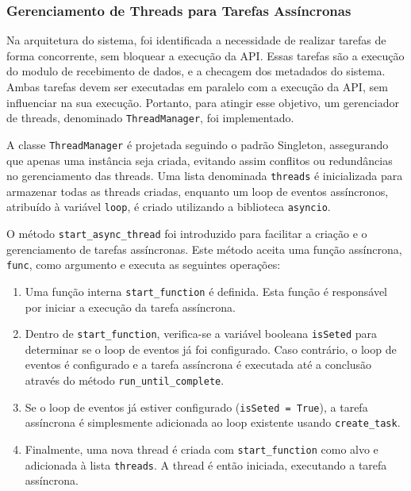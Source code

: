 \subsubsection{Gerenciamento de Threads para Tarefas Assíncronas}\label{subsubsec:ThreadManager}

Na arquitetura do sistema, foi identificada a necessidade de realizar tarefas de forma concorrente, sem bloquear a execução da API. Essas tarefas são a execução do modulo de recebimento de dados, e a checagem dos metadados do sistema. Ambas tarefas devem ser executadas em paralelo com a execução da API, sem influenciar na sua execução. Portanto, para atingir esse objetivo, um gerenciador de threads, denominado \texttt{ThreadManager}, foi implementado.

A classe \texttt{ThreadManager} é projetada seguindo o padrão Singleton, assegurando que apenas uma instância seja criada, evitando assim conflitos ou redundâncias no gerenciamento das threads. Uma lista denominada \texttt{threads} é inicializada para armazenar todas as threads criadas, enquanto um loop de eventos assíncronos, atribuído à variável \texttt{loop}, é criado utilizando a biblioteca \texttt{asyncio}.

O método \texttt{start\_async\_thread} foi introduzido para facilitar a criação e o gerenciamento de tarefas assíncronas. Este método aceita uma função assíncrona, \texttt{func}, como argumento e executa as seguintes operações:

\begin{enumerate}
    \item Uma função interna \texttt{start\_function} é definida. Esta função é responsável por iniciar a execução da tarefa assíncrona.
    \item Dentro de \texttt{start\_function}, verifica-se a variável booleana \texttt{isSeted} para determinar se o loop de eventos já foi configurado. Caso contrário, o loop de eventos é configurado e a tarefa assíncrona é executada até a conclusão através do método \texttt{run\_until\_complete}.
    \item Se o loop de eventos já estiver configurado (\texttt{isSeted = True}), a tarefa assíncrona é simplesmente adicionada ao loop existente usando \texttt{create\_task}.
    \item Finalmente, uma nova thread é criada com \texttt{start\_function} como alvo e adicionada à lista \texttt{threads}. A thread é então iniciada, executando a tarefa assíncrona.
\end{enumerate}

